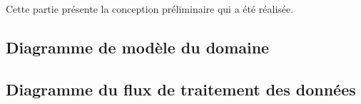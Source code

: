 \par Cette partie présente la conception préliminaire qui a été réalisée.

	\subsection{Diagramme de modèle du domaine}


	\subsection{Diagramme du flux de traitement des données}
